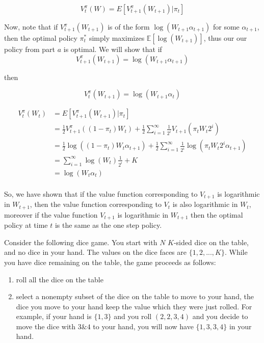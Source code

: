 \documentclass[12pt]{exam}
\begin{document}
\begin{questions}
\begin{enumerate}
\begin{solution}
\[V_{t}^{\pi}(W) = E[V_{t+1}^{\pi}(W_{t+1})| \pi_t]\]

Now, note that if $V_{t+1}^{\pi}(W_{t+1})$ is of the form $\log(W_{t+1}\alpha_{t+1})$ for some $\alpha_{t+1}$, then the optimal policy $\pi_t^*$ simply maximizes $\mathbb{E}[\log(W_{t+1})]$, thus our our policy from part $a$ is optimal. We will show that if 
\[V_{t+1}^{\pi}(W_{t+1}) = \log(W_{t+1}\alpha_{t+1})\]

then 

\[V_{t}^{\pi}(W_{t+1}) = \log(W_{t+1}\alpha_{t})\]

\begin{align*}
    V_{t}^{\pi}(W_{t}) &= E[V_{t+1}^{\pi}(W_{t+1})| \pi_t] \\
    &= \frac{1}{2} V_{t+1}^{\pi}((1- \pi_t) W_t) + \frac{1}{2}\sum_{i=1}^{\infty}\frac{1}{2^i}V_{t+1}(\pi_tW_t 2^i)\\
    &= \frac{1}{2} \log((1-\pi_t) W_t\alpha_{t+1}) + \frac{1}{2}\sum_{i=1}^{\infty}\frac{1}{2^i}\log(\pi_tW_t 2^i \alpha_{t+1})\\
    &= \sum_{i=1}^{\infty}\log(W_t)\frac{1}{2^i} + K\\
    &= \log(W_t\alpha_t)\\
\end{align*}

So, we have shown that if the value function corresponding to $V_{t+1}$ is logarithmic in $W_{t+1}$, then the value function corresponding to $V_{t}$ is also logarithmic in $W_t$, moreover if the value function $V_{t+1}$ is logarithmic in $W_{t+1}$ then the optimal policy at time $t$ is the same as the one step policy.


\end{solution}

\end{enumerate}


\newpage{}

Consider the following dice game. You start with $N$ $K$-sided dice on the table, and no dice in your hand. The values on the dice faces are $\{1, 2, ..., K\}$. While you have dice remaining on the table, the game proceeds as follows:

\begin{enumerate}
    \item roll all the dice on the table
    \item select a nonempty subset of the dice on the table to move to your hand, the dice you move to your hand keep the value which they were just rolled. For example, if your hand is $\{1,3\}$ and you roll $(2,2,3,4)$ and you decide to move the dice with $3 \& 4$ to your hand, you will now have $\{1,3,3,4\}$ in your hand.
\end{enumerate}


\end{questions}
\end{document}
